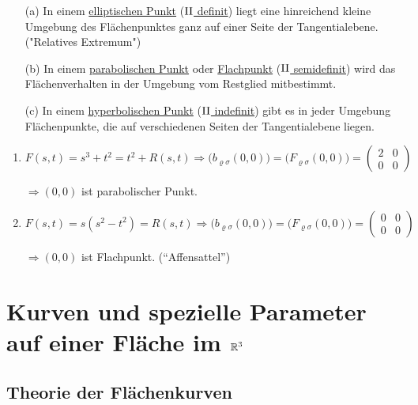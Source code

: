 \begin{folgerung}
 \begin{enumerate}
  \item[(a)] In einem \uline{elliptischen Punkt} (\uline{\(\Rom2\) definit}) liegt eine hinreichend kleine Umgebung des Flächenpunktes ganz auf einer Seite der Tangentialebene. ("Relatives Extremum")
  \item[(b)] In einem \uline{parabolischen Punkt} oder \uline{Flachpunkt} (\uline{\(\Rom2\) semidefinit}) wird das Flächenverhalten in der Umgebung vom Restglied mitbestimmt.
  \item[(c)] In einem \uline{hyperbolischen Punkt} (\uline{\(\Rom2\) indefinit}) gibt es in jeder Umgebung Flächenpunkte, die auf verschiedenen Seiten der Tangentialebene liegen.
 \end{enumerate}
\end{folgerung}

\begin{bsp}[zu (b)]
 \begin{enumerate}
  \item \(F(s,t) = s^3 + t^2 = t^2 + R(s,t) \Rightarrow \big(b_{\varrho \sigma}(0,0)\big) = \big(F_{\varrho \sigma}(0,0)\big) = \begin{pmatrix}
																 2 & 0 \\
																 0 & 0
																\end{pmatrix}\) \par
  \(\Rightarrow (0,0)\) ist parabolischer Punkt.
  \item \(F(s,t) = s(s^2 - t^2) =  R(s,t) \Rightarrow \big(b_{\varrho \sigma}(0,0)\big) = \big(F_{\varrho \sigma} (0,0)\big) = \begin{pmatrix}
																0 & 0 \\
																0 & 0
															       \end{pmatrix}\) \par
  \(\Rightarrow (0,0)\) ist Flachpunkt. (``Affensattel'')
 \end{enumerate}
\end{bsp}

\section{Kurven und spezielle Parameter auf einer Fläche im $\mathbb{R}^3$}

\subsection{Theorie der Flächenkurven}


